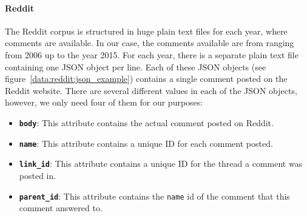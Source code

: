 \paragraph{Reddit} The Reddit corpus is structured in huge plain text files for each year, where comments are available. In our case, the comments available are from ranging from 2006 up to the year 2015. For each year, there is a separate plain text file containing one JSON object per line. Each of these JSON objects (see figure~\ref{data:reddit:json_example}) contains a single comment posted on the Reddit website. There are several different values in each of the JSON objects, however, we only need four of them for our purposes: 

\begin{itemize}[noitemsep]
	\item \textbf{\texttt{body}}: This attribute contains the actual comment posted on Reddit.
	\item \textbf{\texttt{name}}: This attribute contains a unique ID for each comment posted.
	\item \textbf{\texttt{link\_id}}: This attribute contains a unique ID for the thread a comment was posted in.
	\item \textbf{\texttt{parent\_id}}: This attribute contains the \texttt{name} id of the comment that this comment answered to.
\end{itemize}

